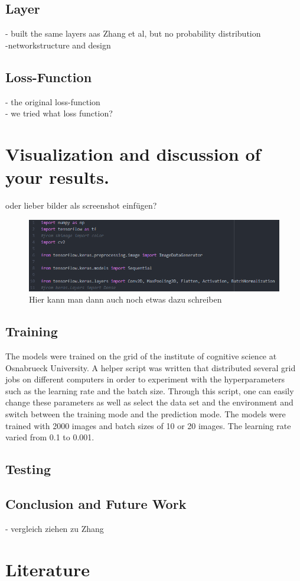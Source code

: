 \documentclass[12pt,letterpaper]{article}
\begin{document}
\subsection{Layer}
- built the same layers aas Zhang et al, but no probability distribution\\
-networkstructure and design\\

\subsection{Loss-Function}
- the original loss-function\\
- we tried what loss function?\\
\section{Visualization and discussion of your results.}
oder lieber bilder als screenshot einfügen?\\
\begin{figure}[ht]
	\centering
	\includegraphics[width=1.0\textwidth]{bsp.png}
	\caption{Hier kann man dann auch noch etwas dazu schreiben}
	\label{bsp}
\end{figure}
\subsection{Training}
The models were trained on the grid of the institute of cognitive science at Osnabrueck University. A helper script was written that distributed several grid jobs on different computers in order to experiment with the hyperparameters such as the learning rate and the batch size. Through this script, one can easily change these parameters as well as select the data set and the environment and switch between the training mode and the prediction mode. The models were trained with 2000 images and batch sizes of 10 or 20 images. The learning rate varied from 0.1 to 0.001.

\subsection{Testing}

\subsection{Conclusion and Future Work}
- vergleich ziehen zu Zhang\\

\section{Literature}
\label{Lit}

\renewcommand{\bibsection}{}


	
\end{document}
